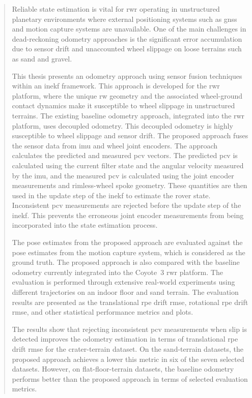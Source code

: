 \documentclass[report.tex]{subfiles}
\begin{document}
    \begin{abstract}
        
        Reliable state estimation is vital for \gls{rwr} operating in unstructured planetary environments where external positioning systems such as \gls{gnss} and motion capture systems are unavailable. One of the main challenges in dead-reckoning odometry approaches is the significant error accumulation due to sensor drift and unaccounted wheel slippage on loose terrains such as sand and gravel. 
        
        This thesis presents an odometry approach using sensor fusion techniques within an \gls{inekf} framework. This approach is developed for the \gls{rwr} platform, where the unique \gls{rw} geometry and the associated wheel-ground contact dynamics make it susceptible to wheel slippage in unstructured terrains. The existing baseline odometry approach, integrated into the \gls{rwr} platform, uses decoupled odometry. This decoupled odometry is highly susceptible to wheel slippage and sensor drift. The proposed approach fuses the sensor data from \gls{imu} and wheel joint encoders. The approach calculates the predicted and measured \gls{pcv} vectors. The predicted \gls{pcv} is calculated using the current filter state and the angular velocity measured by the \gls{imu}, and the measured \gls{pcv} is calculated using the joint encoder measurements and rimless-wheel spoke geometry. These quantities are then used in the update step of the \gls{inekf} to estimate the rover state. Inconsistent \gls{pcv} measurements are rejected before the update step of the \gls{inekf}. This prevents the erroneous joint encoder measurements from being incorporated into the state estimation process. 
        
        The pose estimates from the proposed approach are evaluated against the pose estimates from the motion capture system, which is considered as the ground truth. The proposed approach is also compared with the baseline odometry currently integrated into the Coyote~3 \gls{rwr} platform. The evaluation is performed through extensive real-world experiments using different trajectories on an indoor floor and sand terrain. The evaluation results are presented as the translational \gls{rpe} drift \gls{rmse}, rotational \gls{rpe} drift \gls{rmse}, and other statistical performance metrics and plots. 
        
        The results show that rejecting inconsistent \gls{pcv} measurements when slip is detected improves the odometry estimation in terms of translational \gls{rpe} drift \gls{rmse} for the crater-terrain dataset. On the sand-terrain datasets, the proposed approach achieves a lower this metric in six of the seven selected datasets. However, on flat-floor-terrain datasets, the baseline odometry performs better than the proposed approach in terms of selected evaluation metrics. 
        

\end{abstract}
\end{document}
